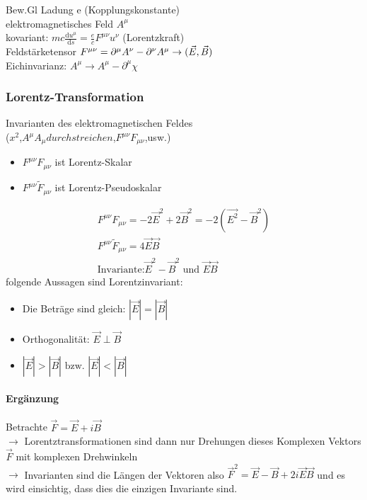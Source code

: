 \documentclass[a4paper]{article}
\begin{document}
Bew.Gl
Ladung e (Kopplungskonstante)\\
elektromagnetisches Feld $A^\mu$\\
kovariant: $mc\frac{\mathrm{d}u^\mu}{\mathrm{d}s}=\frac{e}{c} F^{\mu\nu} u^\nu$ (Lorentzkraft)\\
Feldstärketensor $F^{\mu\nu}=\partial^\mu A^\nu-\partial^\nu A^\mu \\
\rightarrow (\vec{E},\vec{B})$\\
Eichinvarianz: $A^\mu\rightarrow A^\mu-\partial^\mu\chi$\\
\subsubsection{Lorentz-Transformation}
Invarianten des elektromagnetischen Feldes\\
($x^2$,$A^\mu A_\mu durchstreichen$,$F^{\mu\nu}F_{\mu\nu}$,usw.)\\
\begin{itemize}
  \item $F^{\mu\nu}F_{\mu\nu}$ ist Lorentz-Skalar
  \item $F^{\mu\nu}\tilde{F}_{\mu\nu}$ ist Lorentz-Pseudoskalar
\end{itemize}
\begin{align}
F^{\mu\nu}F_{\mu\nu}=-2\vec{E}^2+2\vec{B}^2=-2(\vec{E^2}-\vec{B}^2)\\
F^{\mu\nu}\tilde{F}_{\mu\nu}=4\vec{E}\vec{B}\\
\text{Invariante:} \vec{E}^2-\vec{B}^2 \text{ und } \vec{E}\vec{B}
\end{align}
folgende Aussagen sind Lorentzinvariant:
\begin{itemize}
  \item Die Beträge sind gleich: $|\vec{E}|=|\vec{B}|$
  \item Orthogonalität: $\vec{E} \perp \vec{B}$
  \item $|\vec{E}|>|\vec{B}| \text{ bzw. } |\vec{E}|<|\vec{B}|$
\end{itemize}
\paragraph{Ergänzung}
Betrachte $\vec{F}=\vec{E}+i\vec{B}$\\
$\rightarrow$ Lorentztransformationen sind dann nur Drehungen dieses Komplexen
Vektors $\vec{F}$ mit komplexen Drehwinkeln\\
$\rightarrow$ Invarianten sind die Längen der Vektoren also
$\vec{F}^2=\vec{E}-\vec{B}+2i\vec{E}\vec{B}$ und es wird einsichtig, dass dies
die einzigen Invariante sind.
\end{document}
